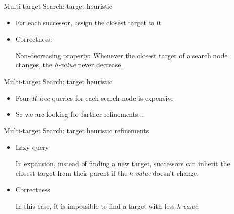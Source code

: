 \begin{frame}{Multi-target Search: target heuristic}
\begin{minipage}{.9\textwidth}
\begin{itemize}
     \item \small{
        For each successor, assign the closest target to it
    }
     \item \small {
    Correctness:
    \begin{lemma}{Non-decreasing property:}
        Whenever the closest target of a search node changes,
        the \textit{h-value} never decrease.
    \end{lemma}
    }
\end{itemize}
\end{minipage}%
\end{frame}

\begin{frame}{Multi-target Search: target heuristic}
\begin{minipage}{.9\textwidth}
\begin{itemize}
    \item \small{Four \textit{R-tree} queries for each search  node is expensive}
    \item \small{So we are looking for further refinements...}
\end{itemize}
\end{minipage}%
\end{frame}

\begin{frame}{Multi-target Search: target heuristic refinements}
\begin{minipage}{.9\textwidth}
\begin{itemize}
    \item \small{Lazy query}
    \begin{Definition}
        In expansion, instead of finding a new target, successors can inherit the closest target from their parent if the \textit{h-value} doesn't change.
    \end{Definition}
    \item \small{Correctness}
    \begin{lemma}
        In this case, it is impossible to find a target with less \textit{h-value}.
    \end{lemma}
\end{itemize}
\end{minipage}%
\end{frame}


